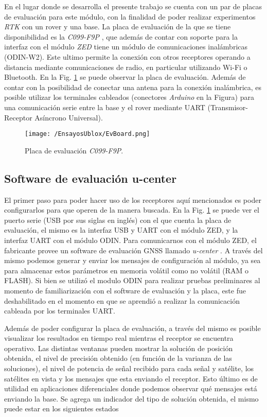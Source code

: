 \documentclass[a4paper,12pt,oneside,onecolumn,final,openright]{book}%
\begin{document}
	En el lugar donde se desarrolla el presente trabajo se cuenta con un par de placas de evaluación para este módulo, con la finalidad de poder realizar experimentos \textit{RTK} con un rover y una base. La placa de evaluación de la que se tiene disponibilidad es la \textit{C099-F9P} \cite{C099_ds}, que además de contar con soporte para la interfaz con el módulo \textit{ZED} tiene un módulo de comunicaciones inalámbricas (ODIN-W2). Este ultimo permite la conexión con otros receptores operando a distancia mediante comunicaciones de radio, en particular utilizando Wi-Fi o Bluetooth. En la Fig. \ref{fig:EvBoard} se puede observar la placa de evaluación. Además de contar con la posibilidad de conectar una antena para la conexión inalámbrica, es posible utilizar los terminales cableados (conectores \textit{Arduino} en la Figura) para una comunicación serie entre la base y el rover mediante UART (Transmisor-Receptor Asíncrono Universal).
	
\begin{figure}
    \centering
    \texttt{[image: /EnsayosUblox/EvBoard.png]}
    \caption{Placa de evaluación \textit{C099-F9P}.}
    \label{fig:EvBoard}
\end{figure}
\subsection{Software de evaluación u-center}\label{sec:ucenter}
	El primer paso para poder hacer uso de los receptores aquí mencionados es poder configurarlos para que operen de la manera buscada. En la Fig. \ref{fig:EvBoard} se puede ver el puerto serie (USB por sus siglas en inglés) con el que cuenta la placa de evaluación, el mismo es la interfaz USB y UART con el módulo ZED, y la interfaz UART con el módulo ODIN. Para comunicarnos con el módulo ZED, el fabricante provee un software de evaluación GNSS llamado \textit{u-center} \cite{u_center}. A través del mismo podemos generar y enviar los mensajes de configuración al módulo, ya sea para almacenar estos parámetros en memoria volátil como no volátil (RAM o FLASH). Si bien se utilizó el modulo ODIN para realizar pruebas preliminares al momento de familiarización con el software de evaluación y la placa, este fue deshabilitado en el momento en que se aprendió a realizar la comunicación cableada por los terminales UART.
	
	Además de poder configurar la placa de evaluación, a través del mismo es posible visualizar los resultados en tiempo real mientras el receptor se encuentra operativo. Las distintas ventanas pueden mostrar la solución de posición obtenida, el nivel de precisión obtenido (en función de la varianza de las soluciones), el nivel de potencia de señal recibido para cada señal y satélite, los satélites en vista y los mensajes que esta enviando el receptor. Esto último es de utilidad en aplicaciones diferenciales donde podemos observar qué mensajes está enviando la base. Se agrega un indicador del tipo de solución obtenida, el mismo puede estar en los siguientes estados
\end{document}
